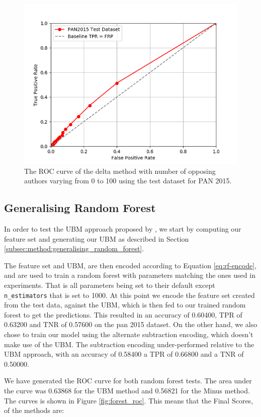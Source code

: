 \begin{figure}
    \centering
    \includegraphics[width=.7\textwidth]{./pictures/delta_method_roc.png}
    \caption{The ROC curve of the delta method with number of opposing authors
    varying from 0 to 100 using the test dataset for PAN 2015.}
    \label{fig:delta_method_roc}
\end{figure}

\subsection{Generalising Random Forest} \label{subsec:results:generalising_random_forest}
In order to test the \gls{UBM} approach proposed by \cite{pacheco2015}, we start
by computing our feature set and generating our \gls{UBM} as described in
Section \ref{subsec:method:generalising_random_forest}.

The feature set and \gls{UBM}, are then encoded according to Equation
\eqref{eq:rf-encode}, and are used to train a random forest with parameters
matching the ones used in experiments. That is all parameters being set to their
default except \texttt{n\_estimators} that is set to 1000. At this point we
encode the feature set created from the test data, against the \gls{UBM}, which
is then fed to our trained random forest to get the predictions. This resulted
in an accuracy of 0.60400, \gls{TPR} of 0.63200 and \gls{TNR} of 0.57600 on the
pan 2015 dataset. On the other hand, we also chose to train our model using the
alternate subtraction encoding, which doesn't make use of the \gls{UBM}. The
subtraction encoding under-performed relative to the \gls{UBM} approach, with an
accuracy of 0.58400 a \gls{TPR} of 0.66800 and a \gls{TNR} of 0.50000.

We have generated the \gls{ROC} curve for both random forest tests. The area
under the curve was 0.63868 for the \gls{UBM} method and 0.56821 for the Minus
method. The curves is shown in Figure \ref{fig:forest_roc}. This means that the
Final Scores, of the methods are:

